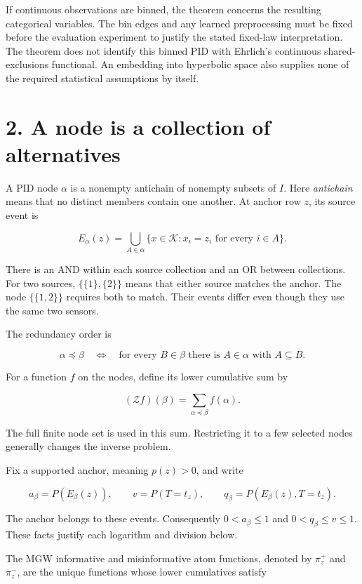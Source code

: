 If continuous observations are binned, the theorem concerns the resulting categorical variables. The bin edges and any learned preprocessing must be fixed before the evaluation experiment to justify the stated fixed-law interpretation. The theorem does not identify this binned PID with Ehrlich's continuous shared-exclusions functional. An embedding into hyperbolic space also supplies none of the required statistical assumptions by itself.

\section{2. A node is a collection of alternatives}\label{a-node-is-a-collection-of-alternatives}

A PID node \(\alpha\) is a nonempty antichain of nonempty subsets of \(I\). Here \emph{antichain} means that no distinct members contain one another. At anchor row \(z\), its source event is

\[
E_\alpha(z)=
\bigcup_{A\in\alpha}
\{x\in\mathcal K:x_i=z_i\text{ for every }i\in A\}.
\]

There is an AND within each source collection and an OR between collections. For two sources, \(\{\{1\},\{2\}\}\) means that either source matches the anchor. The node \(\{\{1,2\}\}\) requires both to match. Their events differ even though they use the same two sensors.

The redundancy order is

\[
\alpha\preceq\beta
\quad\Longleftrightarrow\quad
\text{for every }B\in\beta\text{ there is }A\in\alpha\text{ with }A\subseteq B.
\]

For a function \(f\) on the nodes, define its lower cumulative sum by

\[
(\mathcal Zf)(\beta)=\sum_{\alpha\preceq\beta}f(\alpha).
\]

The full finite node set is used in this sum. Restricting it to a few selected nodes generally changes the inverse problem.

Fix a supported anchor, meaning \(p(z)>0\), and write

\[
a_\beta=P(E_\beta(z)),\qquad
v=P(T=t_z),\qquad
q_\beta=P(E_\beta(z),T=t_z).
\]

The anchor belongs to these events. Consequently \(0<a_\beta\le1\) and \(0<q_\beta\le v\le1\). These facts justify each logarithm and division below.

The MGW informative and misinformative atom functions, denoted by \(\pi_z^+\) and \(\pi_z^-\), are the unique functions whose lower cumulatives satisfy

